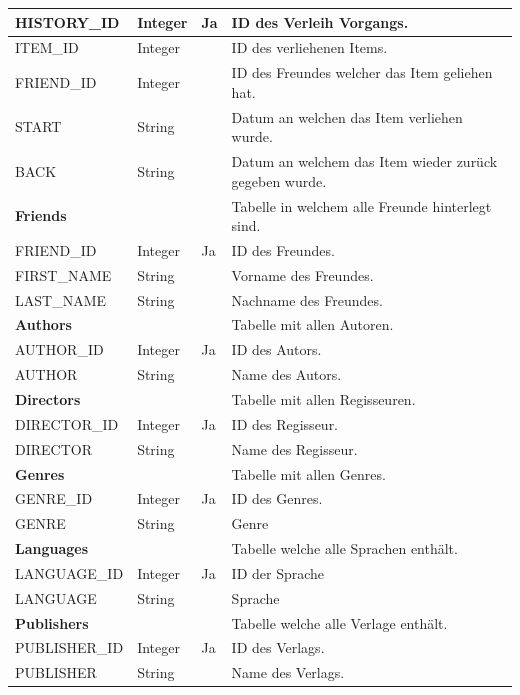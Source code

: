 \begin{longtable}{|l|l|l|l|}
	HISTORY\_ID & Integer & Ja & ID des Verleih Vorgangs. \\ \hline
	\rowcolor{DarkSeaGreen} ITEM\_ID & Integer & & ID des verliehenen Items. \\ \hline
	FRIEND\_ID & Integer & & ID des Freundes welcher das Item geliehen hat. \\ \hline
	\rowcolor{DarkSeaGreen} START & String & & Datum an welchen das Item verliehen wurde. \\ \hline
	BACK & String & & Datum an welchem das Item wieder zurück gegeben wurde. \\ \hline
	\rowcolor{DarkSeaGreen} \textbf{Friends} & & & Tabelle in welchem alle Freunde hinterlegt sind. \\ \hline
	FRIEND\_ID & Integer & Ja & ID des Freundes. \\ \hline
	\rowcolor{DarkSeaGreen} FIRST\_NAME & String & & Vorname des Freundes. \\ \hline
	LAST\_NAME & String & & Nachname des Freundes. \\ \hline
	\rowcolor{DarkSeaGreen} \textbf{Authors} & & & Tabelle mit allen Autoren.  \\ \hline
	AUTHOR\_ID & Integer & Ja & ID des Autors. \\ \hline
	\rowcolor{DarkSeaGreen} AUTHOR & String & & Name des Autors. \\ \hline
	\textbf{Directors} & & & Tabelle mit allen Regisseuren. \\ \hline
	\rowcolor{DarkSeaGreen} DIRECTOR\_ID & Integer & Ja & ID des Regisseur. \\ \hline
	DIRECTOR & String & & Name des Regisseur. \\ \hline
	\rowcolor{DarkSeaGreen} \textbf{Genres} & & & Tabelle mit allen Genres. \\ \hline
	GENRE\_ID & Integer & Ja & ID des Genres. \\ \hline
	\rowcolor{DarkSeaGreen} GENRE & String & & Genre \\ \hline
	\textbf{Languages} & & & Tabelle welche alle Sprachen enthält. \\ \hline
	\rowcolor{DarkSeaGreen} LANGUAGE\_ID & Integer & Ja & ID der Sprache \\ \hline
	LANGUAGE & String & & Sprache \\ \hline
	\rowcolor{DarkSeaGreen} \textbf{Publishers} & & & Tabelle welche alle Verlage enthält. \\ \hline
	PUBLISHER\_ID & Integer & Ja & ID des Verlags. \\ \hline
	\rowcolor{DarkSeaGreen} PUBLISHER & String & & Name des Verlags. \\ \hline

\end{longtable}
